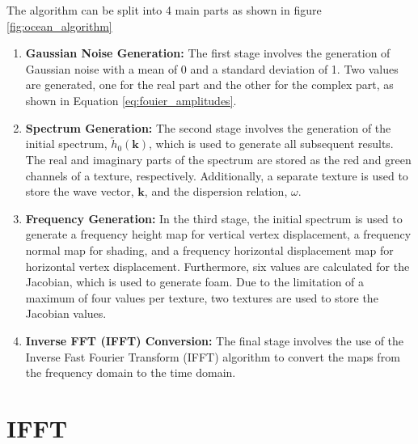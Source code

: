 The algorithm can be split into 4 main parts as shown in figure \ref{fig:ocean_algorithm}
\begin{enumerate}
    \item \textbf{Gaussian Noise Generation:} The first stage involves the generation of Gaussian noise with a mean of 0 and a standard deviation of 1. Two values are generated, one for the real part and the other for the complex part, as shown in Equation \ref{eq:fouier_amplitudes}.
    \item \textbf{Spectrum Generation:} The second stage involves the generation of the initial spectrum, $\tilde{h}_0(\mathbf{k})$, which is used to generate all subsequent results. The real and imaginary parts of the spectrum are stored as the red and green channels of a texture, respectively. Additionally, a separate texture is used to store the wave vector, $\mathbf{k}$, and the dispersion relation, $\omega$.
    \item \textbf{Frequency Generation:} In the third stage, the initial spectrum is used to generate a frequency height map for vertical vertex displacement, a frequency normal map for shading, and a frequency horizontal displacement map for horizontal vertex displacement. Furthermore, six values are calculated for the Jacobian, which is used to generate foam. Due to the limitation of a maximum of four values per texture, two textures are used to store the Jacobian values.
    \item \textbf{Inverse FFT (IFFT) Conversion:} The final stage involves the use of the Inverse Fast Fourier Transform (IFFT) algorithm to convert the maps from the frequency domain to the time domain.
\end{enumerate}

\section{IFFT}

